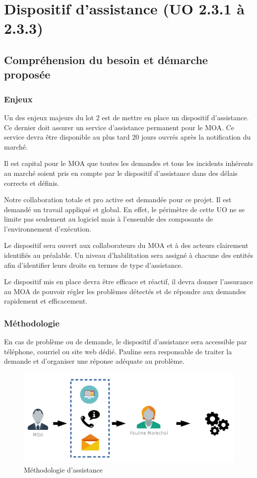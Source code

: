 	\section{Dispositif d'assistance (UO 2.3.1 à 2.3.3)}
	\subsection{Compréhension du besoin et démarche proposée}
	\subsubsection{Enjeux}
	Un des enjeux majeurs du lot 2 est de mettre en place un dispositif d’assistance. Ce dernier doit assurer un service d’assistance permanent pour le MOA. Ce service devra être disponible au plus tard 20 jours ouvrés après la notification du marché.
	
	Il est capital pour le MOA que toutes les demandes et tous les incidents inhérents au marché soient pris en compte par le dispositif d’assistance dans des délais corrects et définis.
	
	Notre collaboration totale et pro active est demandée pour ce projet. Il est demandé un travail appliqué et global. En effet, le périmètre de cette UO ne se limite pas seulement au logiciel mais à l’ensemble des composants de l'environnement d'exécution.
	
	Le dispositif sera ouvert aux collaborateurs du MOA et à des acteurs clairement identifiés au préalable. Un niveau d’habilitation sera assigné à chacune des entités afin d’identifier leurs droits en termes de type d’assistance.
	
	Le dispositif mis en place devra être efficace et réactif, il devra donner l’assurance au MOA de pouvoir régler les problèmes détectés et de répondre aux demandes rapidement et efficacement.
	
	\subsubsection{Méthodologie}
	En cas de problème ou de demande, le dispositif d’assistance sera accessible par téléphone, courriel ou site web dédié. Pauline  sera responsable de traiter la demande et d’organiser une réponse adéquate au problème. 
	
	\begin{figure}
	\centering
	\includegraphics[width=0.8\linewidth]{images/chap3/assistance}
	\caption{Méthodologie d'assistance}
	\label{fig:assistance}
	\end{figure}
	
